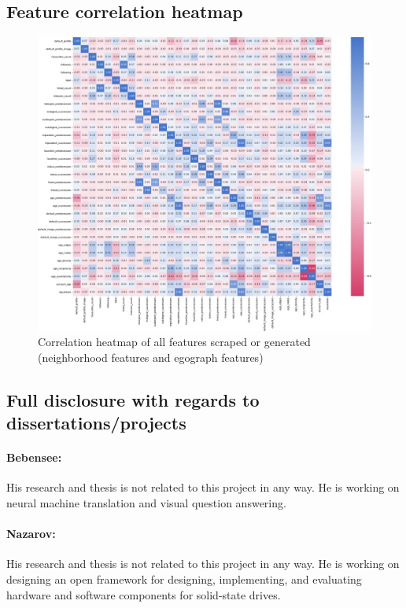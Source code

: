 \subsection{Feature correlation heatmap}

\begin{figure}[H]
    \centering
    \includegraphics[width=\textwidth]{FIG/corr.pdf}
    \caption{Correlation heatmap of all features scraped or generated (neighborhood features and egograph features)}
    \label{fig:corr}
\end{figure}

\subsection{Full disclosure with regards to dissertations/projects}

\paragraph{Bebensee:}
His research and thesis is not related to this project in any way. He is working on neural machine translation and visual question answering.

\paragraph{Nazarov:}
His research and thesis is not related to this project in any way. He is working on designing an open framework for designing, implementing, and evaluating hardware and software components for solid-state drives. 